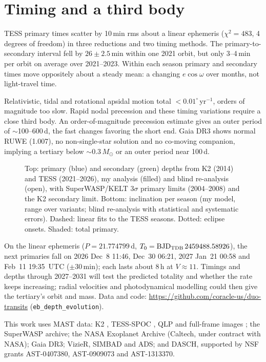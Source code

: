 \documentclass{aastex701}
\begin{document}
\section{Timing and a third body}

TESS primary times scatter by 10\,min rms about a linear ephemeris ($\chi^2=483$, 4 degrees of freedom) in three
reductions and two timing methods. The primary-to-secondary interval fell by $26\pm2.5$\,min within one 2021
orbit, but only 3--4\,min per orbit on average over 2021--2023. Within each season primary and secondary times
move oppositely about a steady mean: a changing $e\cos\omega$ over months, not light-travel time.

Relativistic, tidal and rotational apsidal motion total $<0.01^\circ$\,yr$^{-1}$, orders of magnitude too slow.
Rapid nodal precession and these timing variations require a close third body. An order-of-magnitude
precession estimate gives an outer period of $\sim$100--600\,d, the fast changes favoring the short end. Gaia DR3
\citep{Gaia2023} shows normal RUWE (1.007), no non-single-star solution and no co-moving companion, implying a
tertiary below $\sim$0.3\,$M_\odot$ or an outer period near 100\,d.

\begin{figure}[ht!]
\caption{Top: primary (blue) and secondary (green) depths from K2 (2014) and TESS (2021--2026), my analysis (filled) and blind
re-analysis (open), with SuperWASP/KELT $3\sigma$ primary limits (2004--2008) and the K2 secondary limit. Bottom: inclination per season (my
model, range over variants; blind re-analysis with statistical and systematic errors). Dashed: linear
fits to the TESS seasons. Dotted: eclipse onsets. Shaded: total primary.\label{fig:hist}}
\end{figure}

On the linear ephemeris ($P=21.774799$\,d, $T_0={\rm BJD_{TDB}}\,2459488.58926$), the next primaries fall on 2026
Dec~8 11:46, Dec~30 06:21, 2027 Jan~21 00:58 and Feb~11 19:35~UTC ($\pm30$\,min); each lasts about 8\,h at
$V\approx11$. Timings and depths through 2027--2031 will test the predicted totality and whether the rate keeps
increasing; radial velocities and photodynamical modelling could then give the tertiary's orbit and mass. Data and
code: \url{https://github.com/coracle-us/duo-transits} (\texttt{eb\_depth\_evolution}).

\begin{acknowledgments}
This work uses MAST data: K2 , TESS-SPOC
, QLP
 and full-frame images
; the SuperWASP archive; the NASA Exoplanet
Archive (Caltech, under contract with NASA); Gaia DR3; VizieR, SIMBAD and ADS; and DASCH, supported by NSF grants
AST-0407380, AST-0909073 and AST-1313370.
\end{acknowledgments}
\end{document}
